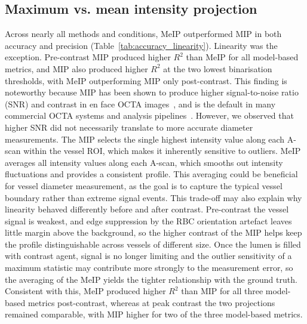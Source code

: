 \documentclass{optica-article}
\begin{document}
\subsection{Maximum vs. mean intensity projection}
\label{subsec:max_vs_mean}
Across nearly all methods and conditions, MeIP outperformed MIP in both accuracy and precision (Table~\ref{tab:accuracy_linearity}). Linearity was the exception. Pre-contrast MIP produced higher $R^2$ than MeIP for all model-based metrics, and MIP also produced higher $R^2$ at the two lowest binarisation thresholds, with MeIP outperforming MIP only post-contrast.  This finding is noteworthy because MIP has been shown to produce higher signal-to-noise ratio (SNR) and contrast in en face OCTA images~\cite{hormelMaximumValueProjection2018}, and is the default in many commercial OCTA systems and analysis pipelines~\cite{sampsonTowardsStandardizingRetinal2022,untrachtTowardsStandardisingRetinal2024}. However, we observed that higher SNR did not necessarily translate to more accurate diameter measurements. The MIP selects the single highest intensity value along each A-scan within the vessel ROI, which makes it inherently sensitive to outliers. MeIP averages all intensity values along each A-scan, which smooths out intensity fluctuations and provides a consistent profile. This averaging could be beneficial for vessel diameter measurement, as the goal is to capture the typical vessel boundary rather than extreme signal events. This trade-off may also explain why linearity behaved differently before and after contrast. Pre-contrast the vessel signal is weakest, and edge suppression by the RBC orientation artefact leaves little margin above the background, so the higher contrast of the MIP helps keep the profile distinguishable across vessels of different size. Once the lumen is filled with contrast agent, signal is no longer limiting and the outlier sensitivity of a maximum statistic may contribute more strongly to the measurement error, so the averaging of the MeIP yields the tighter relationship with the ground truth. Consistent with this, MeIP produced higher $R^2$ than MIP for all three model-based metrics post-contrast, whereas at peak contrast the two projections remained comparable, with MIP higher for two of the three model-based metrics.
\end{document}
